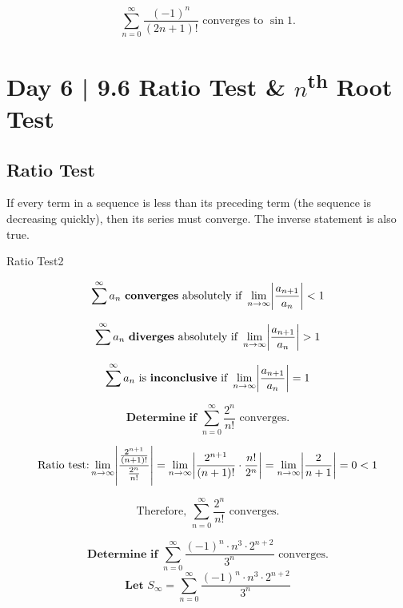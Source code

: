 \documentclass[10pt]{article}
\theoremstyle{definition}
\DeclarePairedDelimiter{\abs}{\lvert}{\rvert}
\begin{document}
\vspace{1cm}

\[\sum_{n=0}^{\infty} \frac{(-1)^n}{(2n+1)!} \text{ converges to } \sin 1.\]



\section{Day 6 | 9.6 Ratio Test \& $n$\textsuperscript{th} Root Test}
\vspace{0.3cm}
\subsection{Ratio Test}

\hypertarget{Ratio Test}{If every term in a sequence is less than its preceding term (the sequence is decreasing quickly), then its series must converge. The inverse statement is also true. }

\begin{theorem}{Ratio Test}{2}

\[\sum^{\infty} a_n \text{ \textbf{converges} absolutely if } \lim_{n \to \infty} \abs*{\frac{a_{n+1}}{a_n}} < 1\]

\[\sum^{\infty} a_n \text{ \textbf{diverges} absolutely  if } \lim_{n \to \infty} \abs*{ \frac{a_{n+1}}{a_n}} > 1\]

\[\sum^{\infty} a_n \text{ is \textbf{inconclusive} if } \lim_{n \to \infty} \abs*{\frac{a_{n+1}}{a_n}} = 1\]

\end{theorem}

\vspace{0.5 cm}

\[ \textbf{Determine if } \sum_{n=0}^{\infty} \frac{2^n}{n!} \text{ converges.}\]

\[\text{Ratio test:}
  \lim_{n \to \infty} \abs*{\frac{\frac{2^{n+1}}{(n+1)!}}{\frac{2^n}{n!}}}
= \lim_{n \to \infty} \abs*{\frac{2^{n+1}}{(n+1)!}  \cdot {\frac{n!}{2^n}}}
= \lim_{n \to \infty} \abs*{\frac{2}{n+1}} = 0 < 1 \]

\[\text{Therefore, }\sum_{n=0}^{\infty} \frac{2^n}{n!} \text{ converges.}\]

\vspace{0.5cm}

\[ \textbf{Determine if } \sum_{n=0}^{\infty} \frac{(-1)^n \cdot n^3 \cdot 2^{n+2}}{3^n} \text{ converges.} \]
\[ \textbf{Let } S_\infty=\sum_{n=0}^{\infty} \frac{(-1)^n \cdot n^3 \cdot 2^{n+2}}{3^n}\]
\end{document}
